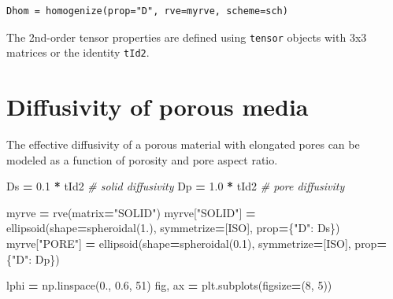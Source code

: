 \documentclass[
  a4paper,
  numbers=noendperiod,
  DIV=12]{scrreprt}
\newenvironment{Shaded}{\begin{snugshade}}{\end{snugshade}}
\newcommand{\CommentTok}[1]{\textcolor[rgb]{0.56,0.35,0.01}{\textit{#1}}}
\newcommand{\DecValTok}[1]{\textcolor[rgb]{0.00,0.00,0.81}{#1}}
\newcommand{\FloatTok}[1]{\textcolor[rgb]{0.00,0.00,0.81}{#1}}
\newcommand{\NormalTok}[1]{#1}
\newcommand{\OperatorTok}[1]{\textcolor[rgb]{0.81,0.36,0.00}{\textbf{#1}}}
\newcommand{\StringTok}[1]{\textcolor[rgb]{0.31,0.60,0.02}{#1}}
\begin{document}
\begin{verbatim}
Dhom = homogenize(prop="D", rve=myrve, scheme=sch)
\end{verbatim}

The 2nd-order tensor properties are defined using \texttt{tensor}
objects with 3x3 matrices or the identity \texttt{tId2}.

\section{Diffusivity of porous media}\label{diffusivity-of-porous-media}

The effective diffusivity of a porous material with elongated pores can
be modeled as a function of porosity and pore aspect ratio.

\begin{Shaded}
\begin{Highlighting}[]
\NormalTok{Ds }\OperatorTok{=} \FloatTok{0.1} \OperatorTok{*}\NormalTok{ tId2   }\CommentTok{\# solid diffusivity}
\NormalTok{Dp }\OperatorTok{=} \FloatTok{1.0} \OperatorTok{*}\NormalTok{ tId2   }\CommentTok{\# pore diffusivity}

\NormalTok{myrve }\OperatorTok{=}\NormalTok{ rve(matrix}\OperatorTok{=}\StringTok{"SOLID"}\NormalTok{)}
\NormalTok{myrve[}\StringTok{"SOLID"}\NormalTok{] }\OperatorTok{=}\NormalTok{ ellipsoid(shape}\OperatorTok{=}\NormalTok{spheroidal(}\FloatTok{1.}\NormalTok{), symmetrize}\OperatorTok{=}\NormalTok{[ISO],}
\NormalTok{                           prop}\OperatorTok{=}\NormalTok{\{}\StringTok{"D"}\NormalTok{: Ds\})}
\NormalTok{myrve[}\StringTok{"PORE"}\NormalTok{] }\OperatorTok{=}\NormalTok{ ellipsoid(shape}\OperatorTok{=}\NormalTok{spheroidal(}\FloatTok{0.1}\NormalTok{), symmetrize}\OperatorTok{=}\NormalTok{[ISO],}
\NormalTok{                          prop}\OperatorTok{=}\NormalTok{\{}\StringTok{"D"}\NormalTok{: Dp\})}

\NormalTok{lphi }\OperatorTok{=}\NormalTok{ np.linspace(}\FloatTok{0.}\NormalTok{, }\FloatTok{0.6}\NormalTok{, }\DecValTok{51}\NormalTok{)}
\NormalTok{fig, ax }\OperatorTok{=}\NormalTok{ plt.subplots(figsize}\OperatorTok{=}\NormalTok{(}\DecValTok{8}\NormalTok{, }\DecValTok{5}\NormalTok{))}


\end{Highlighting}
\end{Shaded}
\end{document}
